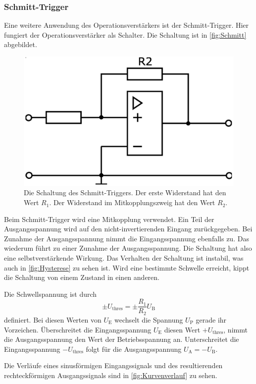 \subsubsection{Schmitt-Trigger}
Eine weitere Anwendung des Operationsverstärkers ist der Schmitt-Trigger. Hier fungiert der Operationsverstärker als Schalter. Die Schaltung ist in \autoref{fig:Schmitt} abgebildet.

\begin{figure}
    \centering
    \includegraphics[width=0.7\linewidth]{./figures/4_Schmitt.png}
    \caption{Die Schaltung des Schmitt-Triggers. Der erste Widerstand hat den Wert $R_1$. Der Widerstand im Mitkopplungszweig hat den Wert $R_2$. \cite{V51}}
    \label{fig:Schmitt}
\end{figure}

Beim Schmitt-Trigger wird eine Mitkopplung verwendet. Ein Teil der Ausgangsspannung wird auf den nicht-invertierenden Eingang zurückgegeben. Bei Zunahme der Ausgangsspannung nimmt die Eingangsspannung ebenfalls zu. Das wiederum führt zu einer Zunahme der Ausgangsspannung. Die Schaltung hat also eine selbstverstärkende Wirkung.
Das Verhalten der Schaltung ist instabil, was auch in \autoref{fig:Hysterese} zu sehen ist. Wird eine bestimmte Schwelle erreicht, kippt die Schaltung von einem Zustand in einen anderen.

Die Schwellspannung ist durch 
\begin{equation}
    \pm U_\text{thres} = \pm \frac{R_1}{R_2} U_\text{B}
    \label{eq:Schwelle}
\end{equation}
definiert. Bei diesen Werten von $U_\text{E}$ wechselt die Spannung $U_\text{P}$ gerade ihr Vorzeichen.
Überschreitet die Eingangsspannung $U_\text{E}$ diesen Wert $+ U_\text{thres}$, nimmt die Ausgangsspannung den Wert der Betriebsspannung an. Unterschreitet die Eingangsspannung $- U_\text{thres}$ folgt für die Ausgangsspannung $U_\text{A} = - U_\text{B}$.

Die Verläufe eines sinusförmigen Eingangssignals und des resultierenden rechteckförmigen Ausgangssignals sind in \autoref{fig:Kurvenverlauf} zu sehen.

